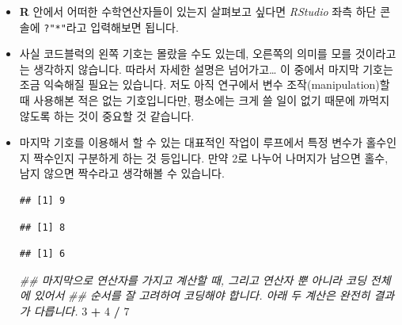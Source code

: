 \documentclass[]{book}
\newenvironment{Shaded}{\begin{snugshade}}{\end{snugshade}}
\newcommand{\CommentTok}[1]{\textcolor[rgb]{0.56,0.35,0.01}{\textit{#1}}}
\newcommand{\DecValTok}[1]{\textcolor[rgb]{0.00,0.00,0.81}{#1}}
\newcommand{\OperatorTok}[1]{\textcolor[rgb]{0.81,0.36,0.00}{\textbf{#1}}}
\newcommand{\StringTok}[1]{\textcolor[rgb]{0.31,0.60,0.02}{#1}}
\begin{document}
\begin{itemize}
\item
  \textbf{R} 안에서 어떠한 수학연산자들이 있는지 살펴보고 싶다면 \emph{RStudio} 좌측 하단 콘솔에 \texttt{?"*"}라고 입력해보면 됩니다.
\item
  사실 코드블럭의 왼쪽 기호는 몰랐을 수도 있는데, 오른쪽의 의미를 모를 것이라고는 생각하지 않습니다. 따라서 자세한 설명은 넘어가고\ldots{} 이 중에서 마지막 기호는 조금 익숙해질 필요는 있습니다. 저도 아직 연구에서 변수 조작(manipulation)할 때 사용해본 적은 없는 기호입니다만, 평소에는 크게 쓸 일이 없기 때문에 까먹지 않도록 하는 것이 중요할 것 같습니다.
\item
  마지막 기호를 이용해서 할 수 있는 대표적인 작업이 루프에서 특정 변수가 홀수인지 짝수인지 구분하게 하는 것 등입니다. 만약 2로 나누어 나머지가 남으면 홀수, 남지 않으면 짝수라고 생각해볼 수 있습니다.

\begin{Shaded}
\end{Shaded}

\begin{verbatim}
## [1] 9
\end{verbatim}

\begin{Shaded}
\end{Shaded}

\begin{verbatim}
## [1] 8
\end{verbatim}

\begin{Shaded}
\end{Shaded}

\begin{verbatim}
## [1] 6
\end{verbatim}

\begin{Shaded}
\begin{Highlighting}[]
\CommentTok{## 마지막으로 연산자를 가지고 계산할 때, 그리고 연산자 뿐 아니라 코딩 전체에 있어서}
\CommentTok{## 순서를 잘 고려하여 코딩해야 합니다. 아래 두 계산은 완전히 결과가 다릅니다.}
\DecValTok{3} \OperatorTok{+}\StringTok{ }\DecValTok{4} \OperatorTok{/}\StringTok{ }\DecValTok{7}
\end{Highlighting}
\end{Shaded}


\end{itemize}
\end{document}
